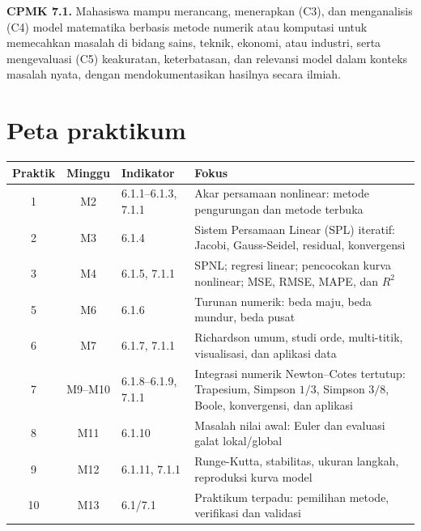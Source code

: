 \documentclass[book,english,noindex,lean,nobackpage,nocopyright,noupdate,nofiglist,notablist]{enacom}
\begin{document}
\textbf{CPMK 7.1.} Mahasiswa mampu merancang, menerapkan (C3), dan menganalisis (C4) model matematika berbasis metode numerik atau komputasi untuk memecahkan masalah di bidang sains, teknik, ekonomi, atau industri, serta mengevaluasi (C5) keakuratan, keterbatasan, dan relevansi model dalam konteks masalah nyata, dengan mendokumentasikan hasilnya secara ilmiah.

\section*{Peta praktikum}
\renewcommand{\arraystretch}{1.25}
\begin{tabularx}{\textwidth}{c c p{} X}
\hline
\textbf{Praktik} & \textbf{Minggu} & \textbf{Indikator} & \textbf{Fokus}\\\hline
1 & M2 & 6.1.1--6.1.3, 7.1.1 & Akar persamaan nonlinear: metode pengurungan dan metode terbuka\\
2 & M3 & 6.1.4 & Sistem Persamaan Linear (SPL) iteratif: Jacobi, Gauss-Seidel, residual, konvergensi\\
3 & M4 & 6.1.5, 7.1.1 & SPNL; regresi linear; pencocokan kurva nonlinear; MSE, RMSE, MAPE, dan $R^2$\\
5 & M6 & 6.1.6 & Turunan numerik: beda maju, beda mundur, beda pusat\\
6 & M7 & 6.1.7, 7.1.1 & Richardson umum, studi orde, multi-titik, visualisasi, dan aplikasi data\\
7 & M9--M10 & 6.1.8--6.1.9, 7.1.1 & Integrasi numerik Newton--Cotes tertutup: Trapesium, Simpson $1/3$, Simpson $3/8$, Boole, konvergensi, dan aplikasi\\
8 & M11 & 6.1.10 & Masalah nilai awal: Euler dan evaluasi galat lokal/global\\
9 & M12 & 6.1.11, 7.1.1 & Runge-Kutta, stabilitas, ukuran langkah, reproduksi kurva model\\
10 & M13 & 6.1/7.1 & Praktikum terpadu: pemilihan metode, verifikasi dan validasi\\\hline
\end{tabularx}
\end{document}

